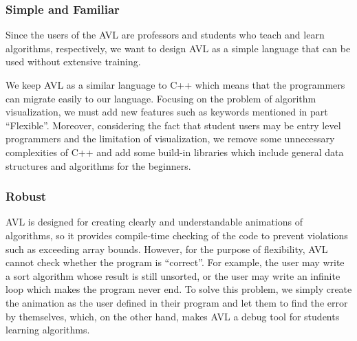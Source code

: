 \subsubsection{Simple and Familiar}

Since the users of the AVL are professors and students who teach and learn algorithms, respectively,
we want to design AVL as a simple language that can be used without extensive training.

We keep AVL as a similar language to C++ which means that the programmers can migrate easily to our
language. Focusing on the problem of algorithm visualization, we must add new features such as
keywords mentioned in part ``Flexible''. Moreover, considering the fact that student users may be
entry level programmers and the limitation of visualization, we remove some unnecessary complexities
of C++ and add some build-in libraries which include general data structures and algorithms for the
beginners.
					   
\subsubsection{Robust}

AVL is designed for creating clearly and understandable animations of algorithms, so it provides
compile-time checking of the code to prevent violations such as exceeding array bounds. However, for
the purpose of flexibility, AVL cannot check whether the program is ``correct''. For example, the
user may write a sort algorithm whose result is still unsorted, or the user may write an infinite
loop which makes the program never end. To solve this problem, we simply create the animation as the
user defined in their program and let them to find the error by themselves, which, on the other
hand, makes AVL a debug tool for students learning algorithms.
